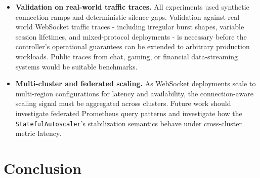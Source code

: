 \documentclass[twocolumn]{svjour3}
\begin{document}
\begin{itemize}[leftmargin=*]
  \item \textbf{Validation on real-world traffic traces.} All experiments used synthetic connection ramps and deterministic silence gaps. Validation against real-world WebSocket traffic traces - including irregular burst shapes, variable session lifetimes, and mixed-protocol deployments - is necessary before the controller's operational guarantees can be extended to arbitrary production workloads. Public traces from chat, gaming, or financial data-streaming systems would be suitable benchmarks.

  \item \textbf{Multi-cluster and federated scaling.} As WebSocket deployments scale to multi-region configurations for latency and availability, the connection-aware scaling signal must be aggregated across clusters. Future work should investigate federated Prometheus query patterns and investigate how the \texttt{StatefulAutoscaler}'s stabilization semantics behave under cross-cluster metric latency.
\end{itemize}


\section{Conclusion}
\label{sec:conclusion}
\end{document}
